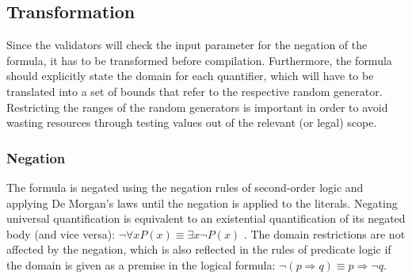 \subsection{Transformation}\label{sec:transformation}
Since the validators will check the input parameter for the negation of the formula, it has to be transformed before compilation. Furthermore, the formula should explicitly state the domain for each quantifier, which will have to be translated into a set of bounds that refer to the respective random generator. Restricting the ranges of the random generators is important in order to avoid wasting resources through testing values out of the relevant (or legal) scope.

\subsubsection{Negation}
The formula is negated using the negation rules of second-order logic and applying De Morgan's laws \cite{de_morgan} until the negation is applied to the literals. Negating universal quantification is equivalent to an existential quantification of its negated body (and vice versa): $\neg \forall x P(x) \equiv \exists x \neg P(x)$ \cite{Sundstrom2020Quantifiers}. The domain restrictions are not affected by the negation, which is also reflected in the rules of predicate logic if the domain is given as a premise in the logical formula: $\neg (p \Rightarrow q) \equiv p \Rightarrow \neg q $.

